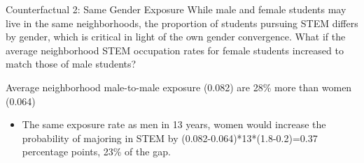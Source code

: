\documentclass[aspectratio=169,xcolor=dvipsnames]{beamer}
\newenvironment{wideitemize}{\itemize\addtolength{\itemsep}{10pt}}{\enditemize}
\begin{document}
\begin{frame}{Counterfactual 2: Same Gender Exposure}\label{counterfactual2_occ}
While male and female students may live in the same neighborhoods, the proportion of students pursuing STEM differs by gender, which is critical in light of the own gender convergence.
What if the average neighborhood STEM occupation rates for female students increased to match those of male students?
\begin{wideitemize}
    \item Average neighborhood male-to-male exposure (0.082) are 28\% more than women (0.064)
    \begin{itemize}
        \item The same exposure rate as men in 13 years, women would increase the probability of majoring in STEM by (0.082-0.064)*13*(1.8-0.2)=0.37 percentage points, 23\% of the gap. 
    \end{itemize} 
\end{wideitemize}
\hyperlink{counterfactual2}{}
\end{frame}


 
\end{document}
